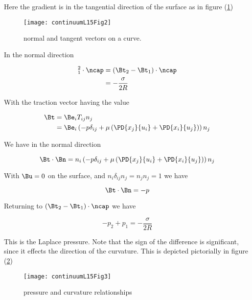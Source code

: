 Here the gradient is in the tangential direction of the surface as in figure (\ref{fig:continuumL15:continuumL15Fig2})
\begin{figure}[htp]
   \centering
   \texttt{[image: continuumL15Fig2]}
   \caption{normal and tangent vectors on a curve.}\label{fig:continuumL15:continuumL15Fig2}
\end{figure}

In the normal direction

\begin{align*}
[\Bt]_1^2 \cdot \ncap
&= (\Bt_2 - \Bt_1) \cdot \ncap \\
&= -\frac{\sigma}{2 R} 
\end{align*}

With the traction vector having the value

\begin{align*}
\Bt 
&= \Be_i T_{ij} n_j \\
&= 
\Be_i \left( 
-p \delta_{ij} + \mu \left( 
\PD{x_j}{u_i}
+\PD{x_i}{u_j}
\right)
\right)
n_j
\end{align*}

We have in the normal direction

\begin{equation}\label{eqn:inclinedFlowWithoutConstantHeightAssumption:10}
\Bt \cdot \Bn 
=
n_i \left( 
-p \delta_{ij} + \mu \left( 
\PD{x_j}{u_i}
+\PD{x_i}{u_j}
\right)
\right) n_j
\end{equation}

With $\Bu = 0$ on the surface, and $n_i \delta_{ij} n_j = n_j n_j = 1$ we have

\begin{equation}\label{eqn:inclinedFlowWithoutConstantHeightAssumption:30}
\Bt \cdot \Bn = -p
\end{equation}

Returning to $(\Bt_2 - \Bt_1) \cdot \ncap$ we have

\begin{equation}\label{eqn:inclinedFlowWithoutConstantHeightAssumption:50}
\boxed{
-p_2 + p_1 = -\frac{\sigma}{2 R} 
}
\end{equation}

This is the Laplace pressure.  Note that the sign of the difference is significant, since it effects the direction of the curvature.  This is depicted pictorially in figure (\ref{fig:continuumL15:continuumL15Fig3})
\begin{figure}[htp]
   \centering
   \texttt{[image: continuumL15Fig3]}
   \caption{pressure and curvature relationships}\label{fig:continuumL15:continuumL15Fig3}
\end{figure}

